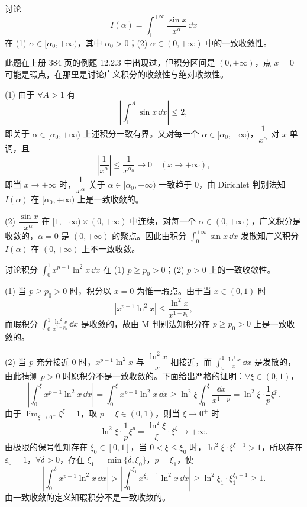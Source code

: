 \begin{xexample}[23.2.2]
讨论
\[
  I(\alpha)=\int_1^{+\infty}\frac{\sin x}{x^\alpha}\,\dd x
\]
在 (1) $\alpha\in[\alpha_0,+\infty)$，其中 $\alpha_0>0$；(2) $\alpha\in(0,+\infty)$ 中的一致收敛性。
\end{xexample}
\begin{xremark}
此题在上册 384 页的例题 12.2.3 中出现过，但积分区间是 $(0,+\infty)$，点 $x=0$ 可能是瑕点，在那里是讨论广义积分的收敛性与绝对收敛性。
\end{xremark}
\begin{xsolution}
(1) 由于 $\forall A>1$ 有
\[
  \left|\int_1^A\sin x\,\dd x\right|\leqslant2,
\]
即关于 $\alpha\in[\alpha_0,+\infty)$ 上述积分一致有界。又对每一个 $\alpha\in[\alpha_0,+\infty)$，$\dfrac1{x^\alpha}$ 对 $x$ 单调，且
\[
  \left|\frac1{x^\alpha}\right|\leqslant\frac1{x^{\alpha_0}}\to0\quad(x\to+\infty),
\]
即当 $x\to+\infty$ 时，$\dfrac1{x^\alpha}$ 关于 $\alpha\in[\alpha_0,+\infty)$ 一致趋于 0，由 Dirichlet 判别法知 $I(\alpha)$ 在 $[\alpha_0,+\infty)$ 上是一致收敛的。

(2) $\dfrac{\sin x}{x^\alpha}$ 在 $[1,+\infty)\times(0,+\infty)$ 中连续，对每一个 $\alpha\in(0,+\infty)$，广义积分是收敛的，$\alpha=0$ 是 $(0,+\infty)$ 的聚点。因此由积分 $\displaystyle\int_0^{+\infty}\sin x\,\dd x$ 发散知广义积分 $I(\alpha)$ 在 $(0,+\infty)$ 上不一致收敛。
\end{xsolution}

\begin{xexample}[23.2.3]
讨论积分 $\displaystyle\int_0^1x^{p-1}\ln^2x\,\dd x$ 在 (1) $p\geqslant p_0>0$；(2) $p>0$ 上的一致收敛性。
\end{xexample}
\begin{xsolution}
(1) 当 $p\geqslant p_0>0$ 时，积分以 $x=0$ 为惟一瑕点。由于当 $x\in(0,1)$ 时
\[
  |x^{p-1}\ln^2x|\leqslant\frac{\ln^2x}{x^{1-p_0}},
\]
而瑕积分 $\displaystyle\int_0^1\frac{\ln^2x}{x^{1-p_0}}\,\dd x$ 是收敛的，故由 M-判别法知积分在 $p\geqslant p_0>0$ 上是一致收敛的。

(2) 当 $p$ 充分接近 0 时，$x^{p-1}\ln^2x$ 与 $\dfrac{\ln^2x}{x}$ 相接近，而 $\displaystyle\int_0^1\frac{\ln^2x}{x}\,\dd x$ 是发散的，由此猜测 $p>0$ 时原积分不是一致收敛的。下面给出严格的证明：$\forall\xi\in(0,1)$，
\[
  \left|\int_0^\xi x^{p-1}\ln^2x\,\dd x\right|=\int_0^\xi x^{p-1}\ln^2x\,\dd x
  \geqslant\ln^2\xi\int_0^\xi\frac{\dd x}{x^{1-p}}
  =\ln^2\xi\cdot\frac1p\xi^p.
\]
由于 $\displaystyle\lim_{\xi\to0^+}\xi^\xi=1$，取 $p=\xi\in(0,1)$，则当 $\xi\to0^+$ 时
\[
  \ln^2\xi\cdot\frac1p\xi^p=\frac{\ln^2\xi}{\xi}\cdot\xi^\xi\to+\infty.
\]
由极限的保号性知存在 $\xi_0\in[0,1]$，当 $0<\xi\leqslant\xi_0$ 时，$\ln^2\xi\cdot\xi^{\xi-1}>1$，所以存在 $\varepsilon_0=1$，$\forall\delta>0$，存在 $\xi_1=\min\{\delta,\xi_0\}$，$p=\xi_1$，使
\[
  \left|\int_0^\delta x^{p-1}\ln^2x\,\dd x\right|
  >\left|\int_0^{\xi_1}x^{\xi_1-1}\ln^2x\,\dd x\right|
  \geqslant\ln^2\xi_1\cdot\xi_1^{\xi_1-1}\geqslant1.
\]
由一致收敛的定义知瑕积分不是一致收敛的。
\end{xsolution}

